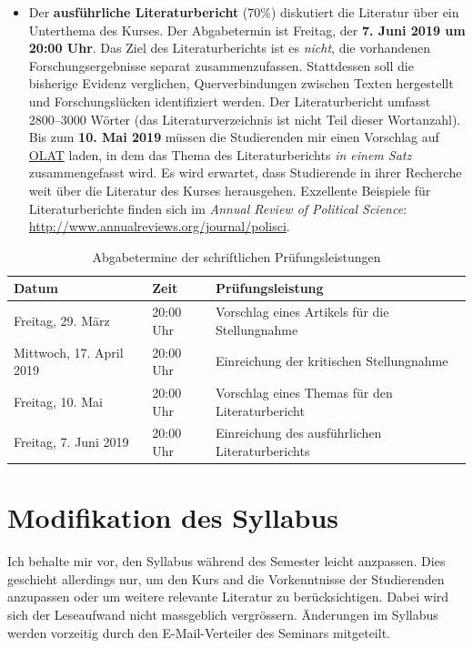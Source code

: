 \documentclass[abstract=on,parskip=full,headings=standardclasses,fontsize=11pt,paper=a4]{scrartcl}
\begin{document}
\begin{itemize}
\item Der \textbf{ausführliche Literaturbericht} (70\%) diskutiert die Literatur über ein Unterthema des Kurses. Der Abgabetermin ist Freitag, der \textbf{7. Juni 2019 um 20:00 Uhr}.  Das Ziel des Literaturberichts ist es \textit{nicht}, die vorhandenen Forschungsergebnisse separat  zusammenzufassen. Stattdessen soll die bisherige Evidenz verglichen,  Querverbindungen zwischen Texten hergestellt und Forschungslücken identifiziert werden. Der Literaturbericht umfasst 2800--3000 Wörter (das Literaturverzeichnis ist  nicht Teil dieser Wortanzahl). Bis zum \textbf{10. Mai 2019} müssen die Studierenden mir einen Vorschlag auf \href{https://lms.uzh.ch/url/RepositoryEntry/16539681116?guest=true&lang=en}{OLAT} laden, in dem das Thema des Literaturberichts \textit{ in einem Satz} zusammengefasst wird. Es wird erwartet, dass Studierende in ihrer Recherche weit über die Literatur des Kurses herausgehen. Exzellente Beispiele für Literaturberichte finden sich im \textit{Annual Review of Political Science}: \url{http://www.annualreviews.org/journal/polisci}.


\end{itemize}


\begin{table}[h] \centering \onehalfspacing \small
\caption*{Abgabetermine der schriftlichen Prüfungsleistungen}
\begin{tabular}{ l l l} 
\toprule
Datum &  Zeit & Prüfungsleistung \\
\midrule
Freitag, 29. März  & 20:00 Uhr &   Vorschlag eines Artikels für die Stellungnahme  \\
Mittwoch, 17. April 2019 & 20:00 Uhr & Einreichung der kritischen Stellungnahme  \\
Freitag, 10. Mai  & 20:00 Uhr &  Vorschlag eines Themas für den Literaturbericht \\
Freitag, 7. Juni 2019 & 20:00 Uhr & Einreichung des ausführlichen Literaturberichts  \\
\bottomrule
\end{tabular}
\end{table}

\section*{Modifikation des Syllabus}

Ich behalte mir vor, den Syllabus während des Semester leicht anzpassen. Dies geschieht allerdings nur, um den Kurs and die Vorkenntnisse der Studierenden anzupassen oder um weitere relevante Literatur zu berücksichtigen. Dabei wird sich der Leseaufwand nicht massgeblich vergrössern. Änderungen im Syllabus werden vorzeitig durch den E-Mail-Verteiler des Seminars  mitgeteilt. 
\end{document}
